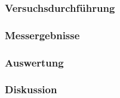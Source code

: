 \documentclass[12pt,a4paper]{article}
\begin{document}
\subsubsection*{Versuchsdurchführung}
\subsubsection*{Messergebnisse}
\subsubsection*{Auswertung}
\subsubsection*{Diskussion}
\end{document}
